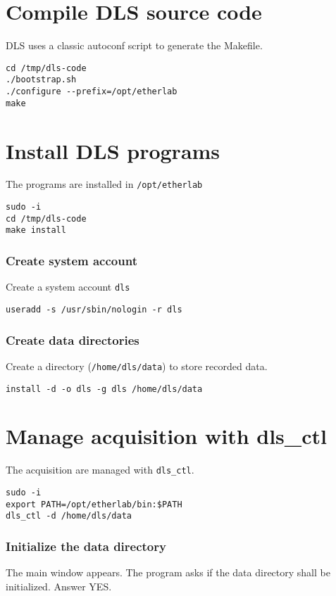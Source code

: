 \section{Compile DLS source code}

DLS uses a classic autoconf script to generate the Makefile.
\begin{verbatim}
cd /tmp/dls-code
./bootstrap.sh
./configure --prefix=/opt/etherlab
make
\end{verbatim}


\section{Install DLS programs}
The programs are installed in \texttt{/opt/etherlab} \\

\begin{verbatim}
sudo -i
cd /tmp/dls-code
make install
\end{verbatim}

\subsubsection{Create system account}
Create a system account \texttt{dls}

\begin{verbatim}
useradd -s /usr/sbin/nologin -r dls
\end{verbatim}


\subsubsection{Create data directories}

Create a directory (\texttt{/home/dls/data}) to store recorded data.
\begin{verbatim}
install -d -o dls -g dls /home/dls/data
\end{verbatim} 


\section{Manage acquisition with dls\_ctl }

The acquisition are managed with \texttt{dls\_ctl}.

\begin{verbatim}
sudo -i
export PATH=/opt/etherlab/bin:$PATH
dls_ctl -d /home/dls/data
\end{verbatim}

\subsubsection{Initialize the data directory}
The main window appears. The program asks if the data directory
  shall be initialized. Answer YES.

